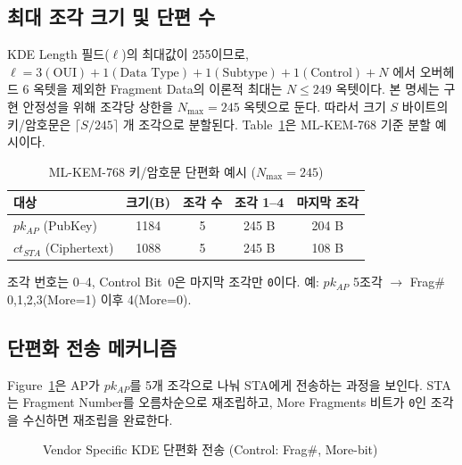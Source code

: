 \documentclass[11pt]{article}
\newcommand{\pkAP}{\ensuremath{pk_{AP}}}
\newcommand{\ctSTA}{\ensuremath{ct_{STA}}}
\newcommand{\code}[1]{\texttt{#1}}
\theoremstyle{definition}
\theoremstyle{plain}
\begin{document}
\subsection{최대 조각 크기 및 단편 수}
KDE Length 필드($\ell$)의 최대값이 255이므로, $\ell = 3(\text{OUI}) +
1(\text{Data Type}) + 1(\text{Subtype}) + 1(\text{Control}) + N$ 에서 오버헤드
6 옥텟을 제외한 Fragment Data의 이론적 최대는 $N \le 249$ 옥텟이다. 본 명세는
구현 안정성을 위해 조각당 상한을 $N_{\max}=245$ 옥텟으로 둔다. 따라서 크기
$S$ 바이트의 키/암호문은 $\lceil S / 245 \rceil$ 개 조각으로 분할된다.
Table~\ref{tab:frag}은 ML-KEM-768 기준 분할 예시이다.

\begin{table}[H]\centering
\caption{ML-KEM-768 키/암호문 단편화 예시 ($N_{\max}=245$)}\label{tab:frag}
\small
\begin{tabular}{@{}lcccc@{}}
\toprule
대상 & 크기(B) & 조각 수 & 조각 1--4 & 마지막 조각 \\ \midrule
\pkAP{} (PubKey) & 1184 & 5 & 245 B & 204 B \\
\ctSTA{} (Ciphertext) & 1088 & 5 & 245 B & 108 B \\
\bottomrule
\end{tabular}
\par\smallskip
\footnotesize 조각 번호는 0--4, Control Bit~0은 마지막 조각만 \code{0}이다.
예: \pkAP{} 5조각 $\to$ Frag\# 0,1,2,3(More=1) 이후 4(More=0).
\end{table}

\subsection{단편화 전송 메커니즘}
Figure~\ref{fig:frag}은 AP가 \pkAP{}를 5개 조각으로 나눠 STA에게 전송하는
과정을 보인다. STA는 Fragment Number를 오름차순으로 재조립하고, More
Fragments 비트가 \code{0}인 조각을 수신하면 재조립을 완료한다.

\begin{figure}[H]\centering
{}
\caption{Vendor Specific KDE 단편화 전송 (Control: Frag\#, More-bit)}\label{fig:frag}
\end{figure}
\end{document}
